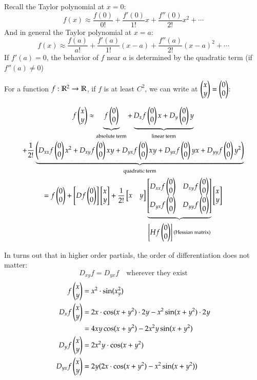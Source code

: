 

Recall the Taylor polynomial at $x=0$: 
\[f(x)\approx \frac{f(0)}{0!} + \frac{f'(0)}{1!}x + \frac{f''(0)}{2!}x^2+\cdots\]
And in general the Taylor polynomial at $x=a$: 
\[f(x)\approx \frac{f(a)}{a!} + \frac{f'(a)}{1!}(x-a) + \frac{f''(a)}{2!}(x-a)^2+\cdots\]
If $f'(a)=0$, the behavior of $f$ near $a$ is determined by the quadratic term (if $f''(a)\neq 0$)

For a function $f : \mathbb{R}^2 \to \mathbb{R}$, if $f$ is at least $C^2$, we can write at $\begin{pmatrix} x \\ y \end{pmatrix} = \begin{pmatrix} 0 \\ 0 \end{pmatrix}$: 

\begin{multline*}
	f\begin{pmatrix} x \\ y \end{pmatrix} \approx \underbrace{f\begin{pmatrix} 0 \\ 0 \end{pmatrix}}_{\text{absolute term}} + \underbrace{D_xf\begin{pmatrix} 0 \\ 0 \end{pmatrix}x + D_y\begin{pmatrix} 0 \\ 0 \end{pmatrix}y}_{\text{linear term}} \\ 
	+ \frac{1}{2!}\underbrace{\left(D_{xx}f\begin{pmatrix} 0 \\ 0 \end{pmatrix}x^2 + D_{xy}f\begin{pmatrix} 0 \\ 0 \end{pmatrix}xy + D_{yx}f\begin{pmatrix} 0 \\ 0 \end{pmatrix} xy + D_{yx}f\begin{pmatrix} 0 \\ 0 \end{pmatrix}yx + D_{yy}f\begin{pmatrix} 0 \\ 0 \end{pmatrix}y^2\right)}_{\text{quadratic term}} \\
	=f\begin{pmatrix} 0 \\ 0 \end{pmatrix} + \begin{bmatrix} Df\begin{pmatrix} 0 \\ 0 \end{pmatrix} \end{bmatrix}\begin{bmatrix} x \\ y \end{bmatrix} + \frac{1}{2!}\begin{bmatrix} x & y \end{bmatrix}\underbrace{\begin{bmatrix} D_{xx}f\begin{pmatrix} 0 \\ 0 \end{pmatrix} & D_{xy}f\begin{pmatrix} 0 \\ 0 \end{pmatrix} \\ D_{yx}f\begin{pmatrix} 0 \\ 0 \end{pmatrix} & D_{yy}f\begin{pmatrix} 0 \\ 0 \end{pmatrix} \end{bmatrix}}_{\begin{bmatrix} Hf\begin{pmatrix} 0 \\ 0 \end{pmatrix} \end{bmatrix}\text{ (Hessian matrix)}}\begin{bmatrix} x \\ y \end{bmatrix}
\end{multline*}

In turns out that in higher order partials, the order of differentiation does not matter: 
\[D_{xy}f=D_{yx}f\quad \text{wherever they exist}\]
\begin{align*}
	f\begin{pmatrix} x \\ y \end{pmatrix} &= x^2\cdot \sin(x_y^2) \\
	D_xf\begin{pmatrix} x \\ y \end{pmatrix} &= 2x \cdot \cos(x+y^2)\cdot 2y -x^2\sin(x+y^2)\cdot 2y \\
	&= 4xy\cos(x+y^2)-2x^2y\sin(x + y^2) \\
	D_yf\begin{pmatrix} x \\ y \end{pmatrix}&=2x^2y\cdot \cos(x +y^2) \\
	D_{yx}f\begin{pmatrix} x \\ y \end{pmatrix} &= 2y (2x\cdot \cos(x+y^2)-x^2\sin(x+y^2))
\end{align*}

